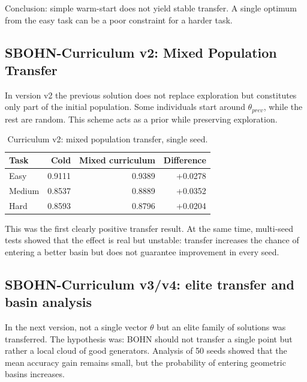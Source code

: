 \documentclass[11pt,a4paper]{report}
\begin{document}
Conclusion: simple warm-start does not yield stable transfer. A single optimum from the
easy task can be a poor constraint for a harder task.

\subsection{SBOHN-Curriculum v2: Mixed Population Transfer}

In version v2 the previous solution does not replace exploration but constitutes only part
of the initial population. Some individuals start around \(\theta_{prev}\), while the rest
are random. This scheme acts as a prior while preserving exploration.

\begin{table}[h]
\centering
\caption{Curriculum v2: mixed population transfer, single seed.}
\begin{tabular}{l r r r}
\hline
Task & Cold & Mixed curriculum & Difference \\
\hline
Easy & 0.9111 & 0.9389 & +0.0278 \\
Medium & 0.8537 & 0.8889 & +0.0352 \\
Hard & 0.8593 & 0.8796 & +0.0204 \\
\hline
\end{tabular}
\end{table}

This was the first clearly positive transfer result. At the same time, multi-seed
tests showed that the effect is real but unstable: transfer increases the chance of
entering a better basin but does not guarantee improvement in every seed.

\subsection{SBOHN-Curriculum v3/v4: elite transfer and basin analysis}

In the next version, not a single vector \(\theta\) but an elite family of solutions was
transferred. The hypothesis was: BOHN should not transfer a single point but rather
a local cloud of good generators. Analysis of 50 seeds showed that the mean accuracy
gain remains small, but the probability of entering geometric basins increases.
\end{document}
